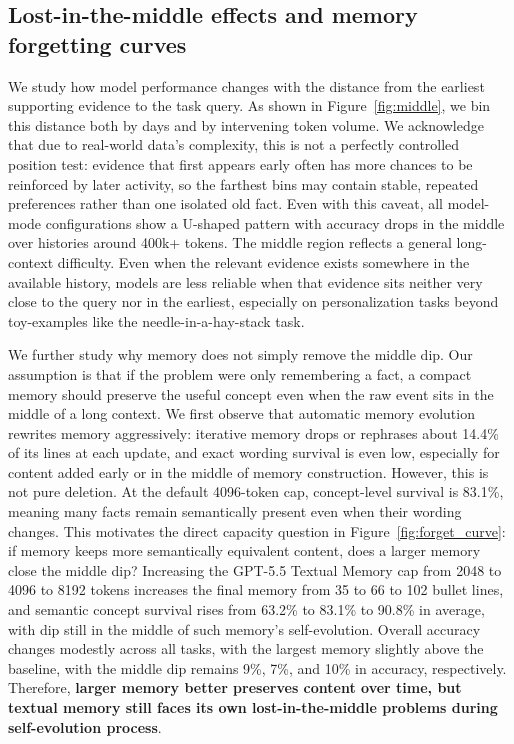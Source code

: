 \documentclass[]{fairmeta}
\begin{document}
\subsection{Lost-in-the-middle effects and memory forgetting curves}

We study how model performance changes with the distance from the earliest supporting evidence to the task query. As shown in Figure~\ref{fig:middle}, we bin this distance both by days and by intervening token volume. We acknowledge that due to real-world data's complexity, this is not a perfectly controlled position test: evidence that first appears early often has more chances to be reinforced by later activity, so the farthest bins may contain stable, repeated preferences rather than one isolated old fact. Even with this caveat, all model-mode configurations show a U-shaped pattern with accuracy drops in the middle over histories around 400k+ tokens. The middle region reflects a general long-context difficulty. Even when the relevant evidence exists somewhere in the available history, models are less reliable when that evidence sits neither very close to the query nor in the earliest, especially on personalization tasks beyond toy-examples like the needle-in-a-hay-stack task. 

We further study why memory does not simply remove the middle dip. Our assumption is that if the problem were only remembering a fact, a compact memory should preserve the useful concept even when the raw event sits in the middle of a long context. We first observe that automatic memory evolution rewrites memory aggressively: iterative memory drops or rephrases about 14.4\% of its lines at each update, and exact wording survival is even low, especially for content added early or in the middle of memory construction. However, this is not pure deletion. At the default 4096-token cap, concept-level survival is 83.1\%, meaning many facts remain semantically present even when their wording changes. This motivates the direct capacity question in Figure~\ref{fig:forget_curve}: if memory keeps more semantically equivalent content, does a larger memory close the middle dip? Increasing the GPT-5.5 Textual Memory cap from 2048 to 4096 to 8192 tokens increases the final memory from 35 to 66 to 102 bullet lines, and semantic concept survival rises from 63.2\% to 83.1\% to 90.8\% in average, with dip still in the middle of such memory's self-evolution. Overall accuracy changes modestly across all tasks, with the largest memory slightly above the baseline, with the middle dip remains 9\%, 7\%, and 10\% in accuracy, respectively. Therefore, \textbf{larger memory better preserves content over time, but textual memory still faces its own lost-in-the-middle problems during self-evolution process}.
\end{document}
